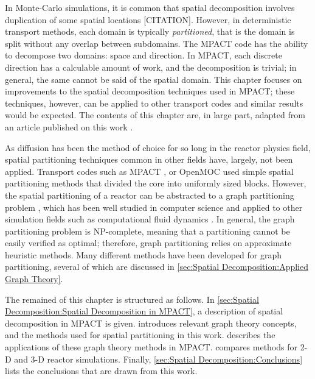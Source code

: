 {{    In Monte-Carlo simulations, it is common that spatial decomposition involves duplication of some spatial locations [CITATION].
    However, in deterministic transport methods, each domain is typically \emph{partitioned}, that is the domain is split without any overlap between subdomains.
    The MPACT \cite{MPACT2016} code has the ability to decompose two domains: space and direction.
    In MPACT, each discrete direction has a calculable amount of work, and the decomposition is trivial; in general, the same cannot be said of the spatial domain.
    This chapter focuses on improvements to the spatial decomposition techniques used in MPACT; these techniques, however, can be applied to other transport codes and similar results would be expected.
    The contents of this chapter are, in large part, adapted from an article published on this work \cite{Fitzgerald2019a}.

    As diffusion has been the method of choice for so long in the reactor physics field, spatial partitioning techniques common in other fields have, largely, not been applied.
    Transport codes such as MPACT \cite{MPACT2016}, or OpenMOC \cite{Gunow2018} used simple spatial partitioning methods that divided the core into uniformly sized blocks.
    However, the spatial partitioning of a reactor can be abstracted to a graph partitioning problem \cite{Fitzgerald2017}, which has been well studied in computer science \cite{Elsner1997} and applied to other simulation fields such as computational fluid dynamics \cite{Yao1998}.
    In general, the graph partitioning problem is NP-complete, meaning that a partitioning cannot be easily verified as optimal; therefore, graph partitioning relies on approximate heuristic methods.
    Many different methods have been developed for graph partitioning, several of which are discussed in \cref{sec:Spatial Decomposition:Applied Graph Theory}.

    The remained of this chapter is structured as follows.
    In \cref{sec:Spatial Decomposition:Spatial Decomposition in MPACT}, a description of spatial decomposition in MPACT is given.
     introduces relevant graph theory concepts, and the methods used for spatial partitioning in this work.
     describes the applications of these graph theory methods in MPACT.
     compares methods for 2-D and 3-D reactor simulations.
    Finally, \cref{sec:Spatial Decomposition:Conclusions} lists the conclusions that are drawn from this work.
  }
}
